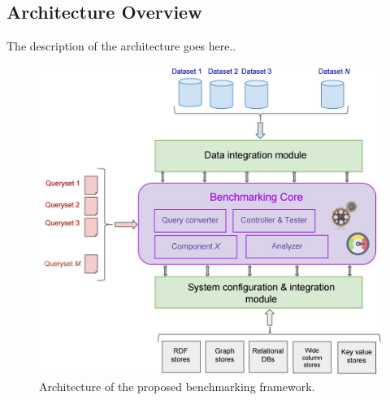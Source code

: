 \documentclass{llncs}
\begin{document}
\begin{itemize}
    

    \subsection{Architecture Overview}
        The description of the architecture goes here.. 
        \begin{figure}[t]
            \centering
            \includegraphics[scale=0.2]{images/benchmark_arch_new}
            \caption{Architecture of the proposed benchmarking framework.}
            \label{fig:benchmark_arch}
        \end{figure}
    

\end{itemize}
\end{document}

